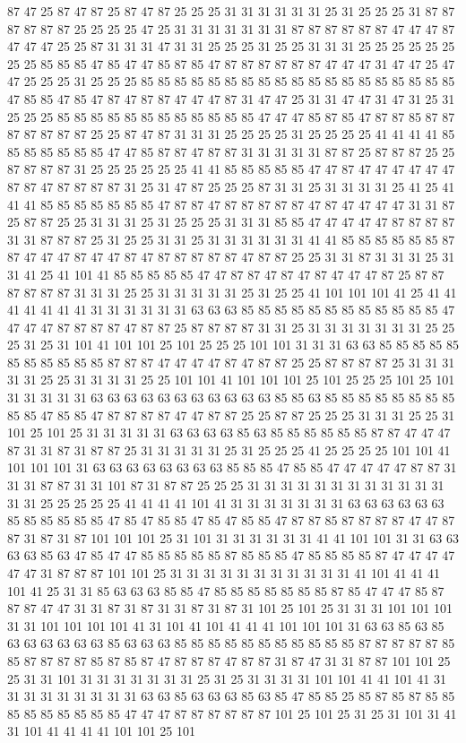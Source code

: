 87 47 25 87 47 87 25 87 47 87 25 25 25 31 31 31 31 31 31 25 31 25 25 25 31 87 87 87 87 87 87 25 25 25 25 47 25 31 31 31 31 31 31 31 87 87 87 87 87 87 47 47 47 87 47 47 47 25 25 87 31 31 31 47 31 31 25 25 25 31 25 25 31 31 31 25 25 25 25 25 25 25 25 85 85 85 47 85 47 47 85 87 85 47 87 87 87 87 87 87 47 47 47 31 47 47 25 47 47 25 25 25 31 25 25 25 85 85 85 85 85 85 85 85 85 85 85 85 85 85 85 85 85 85 85 47 85 85 47 85 47 87 47 87 87 47 47 47 87 31 47 47 25 31 31 47 47 31 47 31 25 31 25 25 25 85 85 85 85 85 85 85 85 85 85 85 85 47 47 47 85 87 85 47 87 87 85 87 87 87 87 87 87 87 25 25 87 47 87 31 31 31 25 25 25 25 31 25 25 25 25 41 41 41 41 85 85 85 85 85 85 85 47 47 85 87 87 47 87 87 31 31 31 31 31 87 87 25 87 87 87 25 25 87 87 87 87 31 25 25 25 25 25 25 41 41 85 85 85 85 85 47 47 87 47 47 47 47 47 47 87 87 47 87 87 87 87 31 25 31 47 87 25 25 25 87 31 31 25 31 31 31 31 25 41 25 41 41 41 85 85 85 85 85 85 85 47 87 87 47 87 87 87 87 87 47 87 47 47 47 47 31 31 87 25 87 87 25 25 31 31 31 25 31 25 25 25 31 31 31 85 85 47 47 47 47 47 87 87 87 87 31 31 87 87 87 25 31 25 25 31 31 25 31 31 31 31 31 31 41 41 85 85 85 85 85 85 87 87 47 47 47 87 47 47 87 47 87 87 87 87 87 47 87 87 25 25 31 31 87 31 31 31 25 31 31 41 25 41 101 41 85 85 85 85 85 47 47 87 87 47 87 47 87 47 47 47 87 25 87 87 87 87 87 87 31 31 31 25 25 31 31 31 31 31 25 31 25 25 41 101 101 101 41 25 41 41 41 41 41 41 41 31 31 31 31 31 31 63 63 63 85 85 85 85 85 85 85 85 85 85 85 85 47 47 47 47 87 87 87 87 47 87 87 25 87 87 87 87 31 31 25 31 31 31 31 31 31 31 25 25 25 31 25 31 101 41 101 101 25 101 25 25 25 101 101 31 31 31 63 63 85 85 85 85 85 85 85 85 85 85 85 87 87 87 47 47 47 47 87 47 87 87 25 25 87 87 87 87 25 31 31 31 31 31 25 25 31 31 31 31 25 25 101 101 41 101 101 101 25 101 25 25 25 101 25 101 31 31 31 31 31 63 63 63 63 63 63 63 63 63 63 63 85 85 63 85 85 85 85 85 85 85 85 85 85 47 85 85 47 87 87 87 87 47 47 87 87 25 25 87 87 25 25 25 31 31 31 25 25 31 101 25 101 25 31 31 31 31 31 63 63 63 63 85 63 85 85 85 85 85 85 87 87 47 47 47 87 31 31 87 31 87 87 25 31 31 31 31 31 25 31 25 25 25 41 25 25 25 25 101 101 41 101 101 101 31 63 63 63 63 63 63 63 63 85 85 85 47 85 85 47 47 47 47 47 87 87 31 31 31 87 87 31 31 101 87 31 87 87 25 25 25 31 31 31 31 31 31 31 31 31 31 31 31 31 31 25 25 25 25 25 41 41 41 41 101 41 31 31 31 31 31 31 31 63 63 63 63 63 63 85 85 85 85 85 85 47 85 47 85 85 47 85 47 85 85 47 87 87 85 87 87 87 87 47 47 87 87 31 87 31 87 101 101 101 25 31 101 31 31 31 31 31 31 41 41 101 101 31 31 63 63 63 63 85 63 47 85 47 47 85 85 85 85 85 87 85 85 85 47 85 85 85 85 87 47 47 47 47 47 47 31 87 87 87 101 101 25 31 31 31 31 31 31 31 31 31 31 31 41 101 41 41 41 101 41 25 31 31 85 63 63 63 85 85 47 85 85 85 85 85 85 85 87 85 47 47 47 85 87 87 87 47 47 31 31 87 31 87 31 31 87 31 87 31 101 25 101 25 31 31 31 101 101 101 31 31 101 101 101 101 41 31 101 41 101 41 41 41 101 101 101 31 63 63 85 63 85 63 63 63 63 63 63 85 63 63 63 85 85 85 85 85 85 85 85 85 85 85 87 87 87 87 87 85 85 87 87 87 87 85 87 85 87 47 87 87 87 47 87 87 31 87 47 31 31 87 87 101 101 25 25 31 31 101 31 31 31 31 31 31 31 25 31 25 31 31 31 31 101 101 41 41 101 41 31 31 31 31 31 31 31 31 31 63 63 85 63 63 63 85 63 85 47 85 85 25 85 87 85 87 85 85 85 85 85 85 85 85 85 47 47 47 87 87 87 87 87 87 101 25 101 25 31 25 31 101 31 41 31 101 41 41 41 41 101 101 25 101 